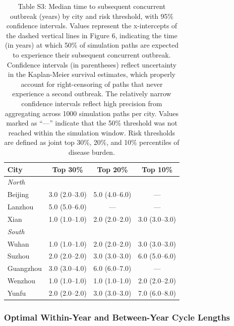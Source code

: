 \begin{table}[htbp]
\centering
\caption{Table S3: Median time to subsequent concurrent outbreak (years) by city and risk threshold, with 95\% confidence intervals. Values represent the x-intercepts of the dashed vertical lines in Figure 6, indicating the time (in years) at which 50\% of simulation paths are expected to experience their subsequent concurrent outbreak. Confidence intervals (in parentheses) reflect uncertainty in the Kaplan-Meier survival estimates, which properly account for right-censoring of paths that never experience a second outbreak. The relatively narrow confidence intervals reflect high precision from aggregating across 1000 simulation paths per city. Values marked as ``---'' indicate that the 50\% threshold was not reached within the simulation window. Risk thresholds are defined as joint top 30\%, 20\%, and 10\% percentiles of disease burden.}
\label{tab:survival_median_times}
\begin{tabular}{lccc}
\toprule
\textbf{City} & \textbf{Top 30\%} & \textbf{Top 20\%} & \textbf{Top 10\%} \\
\midrule
\multicolumn{4}{l}{\textit{North}} \\
Beijing & 3.0 (2.0--3.0) & 5.0 (4.0--6.0) & --- \\
Lanzhou & 5.0 (5.0--6.0) & --- & --- \\
Xian & 1.0 (1.0--1.0) & 2.0 (2.0--2.0) & 3.0 (3.0--3.0) \\
\midrule
\multicolumn{4}{l}{\textit{South}} \\
Wuhan & 1.0 (1.0--1.0) & 2.0 (2.0--2.0) & 3.0 (3.0--3.0) \\
Suzhou & 2.0 (2.0--2.0) & 3.0 (3.0--3.0) & 6.0 (5.0--6.0) \\
Guangzhou & 3.0 (3.0--4.0) & 6.0 (6.0--7.0) & --- \\
Wenzhou & 1.0 (1.0--1.0) & 1.0 (1.0--1.0) & 2.0 (2.0--2.0) \\
Yunfu & 2.0 (2.0--2.0) & 3.0 (3.0--3.0) & 7.0 (6.0--8.0) \\
\bottomrule
\end{tabular}
\end{table}

\clearpage

\subsubsection{Optimal Within-Year and Between-Year Cycle Lengths}
\label{subsec:optimal_cycles}

